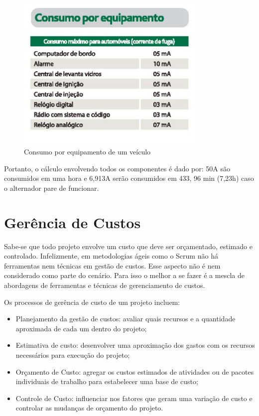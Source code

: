 \begin{figure}[h]
  \centering
  \includegraphics[width=350px, scale=1]{figuras/consumo_equip}
  \caption{Consumo por equipamento de um veículo}
\label{fig:consumo_equip}
\end{figure}

Portanto, o cálculo envolvendo todos os componentes é dado por:
50A são consumidos em uma hora e 6,913A serão consumidos em 433, 96 min (7,23h) caso o alternador pare de funcionar.

\section{Gerência de Custos}

Sabe-se que todo projeto envolve um custo que deve ser orçamentado, estimado e controlado. Infelizmente, em metodologias ágeis como o Scrum não há ferramentas nem técnicas em gestão de custos. Esse aspecto não é nem considerado como parte do cenário. Para isso o melhor a se fazer é a mescla de abordagens de ferramentas e técnicas de gerenciamento de custos.

Os processos de gerência de custo de um projeto incluem:

\begin{itemize}
	\item Planejamento da gestão de custos: avaliar quais recursos e a quantidade aproximada de cada um dentro do projeto;
	\item Estimativa de custo: desenvolver uma aproximação dos gastos com os recursos necessários para execução do projeto;
	\item Orçamento de Custo: agregar os custos estimados de atividades ou de pacotes individuais de trabalho para estabelecer uma base de custo;
	\item Controle de Custo: influenciar nos fatores que geram uma variação de custo e controlar as mudanças de orçamento do projeto.
\end{itemize}

